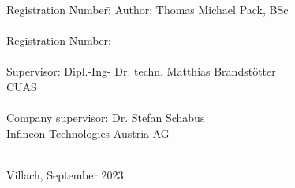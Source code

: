 \vspace{0.5cm}
\begin{tabbing}
Registration Number:\hspace{1cm}\= \kill
Author:			\> Thomas Michael Pack, BSc \\~\\
Registration Number:	 \\~\\
Supervisor:		\> Dipl.-Ing- Dr. techn. Matthias Brandstötter \\
			\> CUAS \\~\\
Company supervisor:	\> Dr. Stefan Schabus  \\
			\> Infineon Technologies Austria AG \\~\\
\end{tabbing}

\vfill
Villach, September 2023

